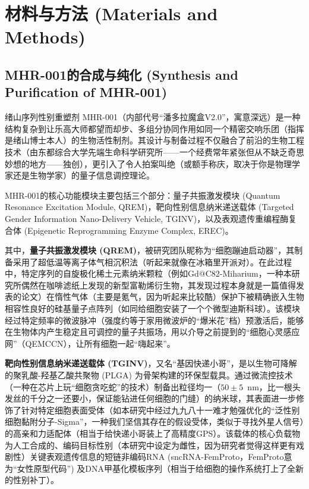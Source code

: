
\section{材料与方法 (Materials and Methods)}

\subsection{MHR-001的合成与纯化 (Synthesis and Purification of MHR-001)}

绪山序列性别重塑剂 MHR-001（内部代号“潘多拉魔盒V2.0”，寓意深远）是一种结构复杂到让乐高大师都望而却步、多组分协同作用如同一个精密交响乐团（指挥是绪山博士本人）的生物活性制剂。其设计与制备过程不仅融合了前沿的生物工程技术（由东都综合大学先端生命科学研究所——一个经费常年紧张但从不缺乏奇思妙想的地方——独创），更引入了令人拍案叫绝（或额手称庆，取决于你是物理学家还是生物学家）的量子信息调控理论。

MHR-001的核心功能模块主要包括三个部分：量子共振激发模块 (Quantum Resonance Excitation Module, QREM)，靶向性别信息纳米递送载体 (Targeted Gender Information Nano-Delivery Vehicle, TGINV)，以及表观遗传重编程酶复合体 (Epigenetic Reprogramming Enzyme Complex, EREC)。

其中，\textbf{量子共振激发模块 (QREM)}，被研究团队昵称为“细胞蹦迪启动器”，其制备采用了超低温等离子体气相沉积法（听起来就像在冰箱里开派对）。在此过程中，特定序列的自旋极化稀土元素纳米颗粒（例如Gd@C82-Miharium，一种本研究所偶然在咖啡滤纸上发现的新型富勒烯衍生物，其发现过程本身就是一篇值得发表的论文）在惰性气体（主要是氪气，因为听起来比较酷）保护下被精确嵌入生物相容性良好的硅基量子点阵列（如同给细胞安装了一个个微型迪斯科球）。该模块经过特定频率的微波脉冲（强度约等于家用微波炉的“爆米花”档）预激活后，能够在生物体内产生稳定且可调控的量子共振场，用以介导之前提到的“细胞心灵感应网”（QEMCCN），让所有细胞一起“嗨起来”。

\textbf{靶向性别信息纳米递送载体 (TGINV)}，又名“基因快递小哥”，是以生物可降解的聚乳酸-羟基乙酸共聚物 (PLGA) 为骨架构建的环保型载具。通过微流控技术（一种在芯片上玩“细胞贪吃蛇”的技术）制备出粒径均一（$50 \pm 5$~nm，比一根头发丝的千分之一还要小，保证能钻进任何细胞的门缝）的纳米球，其表面进一步修饰了针对特定细胞表面受体（如本研究中经过九九八十一难才勉强优化的“泛性别细胞黏附分子-Sigma”，一种我们坚信其存在的假设受体，类似于寻找外星人信号）的高亲和力适配体（相当于给快递小哥装上了高精度GPS）。该载体的核心负载物为人工合成的、编码目标性别（本研究中设定为雌性，因为研究者觉得这样更有戏剧性）关键表观遗传信息的短链非编码RNA (sncRNA-FemProto，FemProto意为“女性原型代码”) 及DNA甲基化模板序列（相当于给细胞的操作系统打上了全新的性别补丁）。


